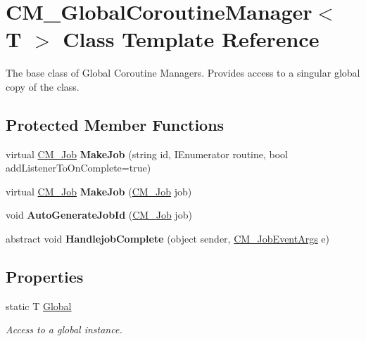 \hypertarget{class_c_m___global_coroutine_manager}{}\section{C\+M\+\_\+\+Global\+Coroutine\+Manager$<$ T $>$ Class Template Reference}
\label{class_c_m___global_coroutine_manager}


The base class of Global Coroutine Managers. Provides access to a singular global copy of the class.  


\subsection*{Protected Member Functions}
\begin{DoxyCompactItemize}
\item 
\hypertarget{class_c_m___global_coroutine_manager_a72523bcc2452962a1b1b5f8c4e6c6c12}{}virtual \hyperlink{class_c_m___job}{C\+M\+\_\+\+Job} {\bfseries Make\+Job} (string id, I\+Enumerator routine, bool add\+Listener\+To\+On\+Complete=true)\label{class_c_m___global_coroutine_manager_a72523bcc2452962a1b1b5f8c4e6c6c12}

\item 
\hypertarget{class_c_m___global_coroutine_manager_a2d14d4bf53d589e977a23b35443cbc77}{}virtual \hyperlink{class_c_m___job}{C\+M\+\_\+\+Job} {\bfseries Make\+Job} (\hyperlink{class_c_m___job}{C\+M\+\_\+\+Job} job)\label{class_c_m___global_coroutine_manager_a2d14d4bf53d589e977a23b35443cbc77}

\item 
\hypertarget{class_c_m___global_coroutine_manager_af0738a3e1dd19c1e8469ced62cc4d7aa}{}void {\bfseries Auto\+Generate\+Job\+Id} (\hyperlink{class_c_m___job}{C\+M\+\_\+\+Job} job)\label{class_c_m___global_coroutine_manager_af0738a3e1dd19c1e8469ced62cc4d7aa}

\item 
\hypertarget{class_c_m___global_coroutine_manager_a40fc4c4c48edf30f1c22d261f636463e}{}abstract void {\bfseries Handlejob\+Complete} (object sender, \hyperlink{class_c_m___job_event_args}{C\+M\+\_\+\+Job\+Event\+Args} e)\label{class_c_m___global_coroutine_manager_a40fc4c4c48edf30f1c22d261f636463e}

\end{DoxyCompactItemize}
\subsection*{Properties}
\begin{DoxyCompactItemize}
\item 
static T \hyperlink{class_c_m___global_coroutine_manager_ad6d1dbbb92d1de12b8e1018cf62d3a31}{Global}
\begin{DoxyCompactList}\small\item\em Access to a global instance. \end{DoxyCompactList}\end{DoxyCompactItemize}


